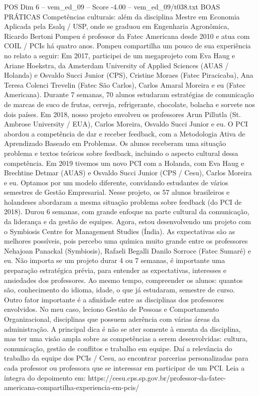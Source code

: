 \begin{textsample}{POS Dim 6 – vem\_ed\_09 – Score -4.00 – vem\_ed\_09/t038.txt}  \label{ex:f6_pos_136}
BOAS PRÁTICAS Competências culturais: além da disciplina Mestre em Economia Aplicada pela Esalq / USP, onde se graduou em Engenharia Agronômica, Ricardo Bertoni Pompeu é professor da Fatec Americana desde 2010 e atua com COIL / PCIs há quatro anos.
Pompeu compartilha um pouco de sua experiência no relato a seguir: Em 2017, participei de um megaprojeto com Eva Haug e Ariane Hoekstra, da Amsterdam University of Applied Sciences (AUAS / Holanda) e Osvaldo Succi Junior (CPS), Cristine Moraes (Fatec Piracicaba), Ana Teresa Colenci Trevelin (Fatec São Carlos), Carlos Amaral Moreira e eu (Fatec Americana).
Durante 7 semanas, 70 alunos estudaram estratégias de comunicação de marcas de suco de frutas, cerveja, refrigerante, chocolate, bolacha e sorvete nos dois países.
Em 2018, nosso projeto envolveu os professores Arun Pillutla (St.
Ambrose University / EUA), Carlos Moreira, Osvaldo Succi Junior e eu.
O PCI abordou a competência de dar e receber feedback, com a Metodologia Ativa de Aprendizado Baseado em Problemas.
Os alunos receberam uma situação problema e textos teóricos sobre feedback, incluindo o aspecto cultural dessa competência.
Em 2019 tivemos um novo PCI com a Holanda, com Eva Haug e Brechtine Detmar (AUAS) e Osvaldo Succi Junior (CPS / Cesu), Carlos Moreira e eu.
Optamos por um modelo diferente, convidando estudantes de vários semestres de Gestão Empresarial.
Nesse projeto, os 57 alunos brasileiros e holandeses abordaram a mesma situação problema sobre feedback (do PCI de 2018).
Durou 6 semanas, com grande enfoque na parte cultural da comunicação, da liderança e da gestão de equipes.
Agora, estou desenvolvendo um projeto com o Symbiosis Centre for Management Studies (Índia).
As expectativas são as melhores possíveis, pois percebo uma química muito grande entre os professores Nehajoan Panackal (Symbiosis), Rafaeli Begalli Danilo Sorroce (Fatec Sumaré) e eu.
Não importa se um projeto durar 4 ou 7 semanas, é importante uma preparação estratégica prévia, para entender as expectativas, interesses e ansiedades dos professores.
Ao mesmo tempo, compreender os alunos: quantos são, conhecimento do idioma, idade, o que já estudaram, semestre de curso.
Outro fator importante é a afinidade entre as disciplinas dos professores envolvidos.
No meu caso, leciono Gestão de Pessoas e Comportamento Organizacional, disciplinas que possuem aderência com várias áreas da administração.
A principal dica é não se ater somente à ementa da disciplina, mas ter uma visão ampla sobre as competências a serem desenvolvidas: cultura, comunicação, gestão de conflitos e trabalho em equipe.
Daí a relevância do trabalho da equipe dos PCIs / Cesu, ao encontrar parcerias personalizadas para cada professor ou professora que se interessar em participar de um PCI.
Leia a íntegra do depoimento em: https://cesu.cps.sp.gov.br/professor-da-fatec-americana-compartilha-experiencia-em-pcis/

\end{textsample}
